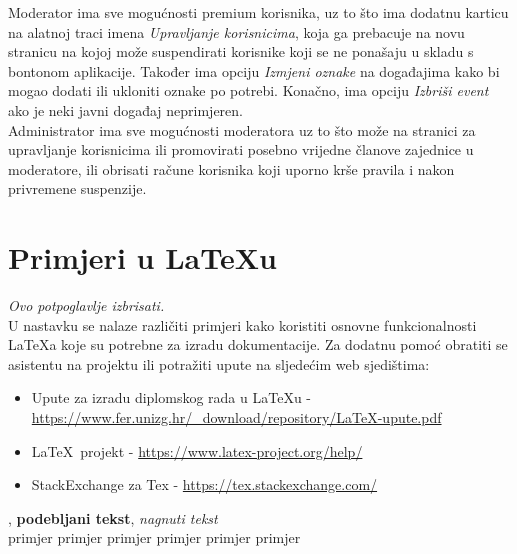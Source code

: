 		\indent Moderator ima sve mogućnosti premium korisnika, uz to što ima dodatnu karticu na alatnoj traci imena \textit{Upravljanje korisnicima}, koja ga prebacuje na novu stranicu na kojoj može suspendirati korisnike koji se ne ponašaju u skladu s bontonom aplikacije. Također ima opciju \textit{Izmjeni oznake} na događajima kako bi mogao dodati ili ukloniti oznake po potrebi. Konačno, ima opciju \textit{Izbriši event} ako je neki javni događaj neprimjeren. \\
		
		\indent Administrator ima sve mogućnosti moderatora uz to što može na stranici za upravljanje korisnicima ili promovirati posebno vrijedne članove zajednice u moderatore, ili obrisati račune korisnika koji uporno krše pravila i nakon privremene suspenzije.
		
		\section{Primjeri u \LaTeX u}
		
		\textit{Ovo potpoglavlje izbrisati.}\\

		U nastavku se nalaze različiti primjeri kako koristiti osnovne funkcionalnosti \LaTeX a koje su potrebne za izradu dokumentacije. Za dodatnu pomoć obratiti se asistentu na projektu ili potražiti upute na sljedećim web sjedištima:
		\begin{itemize}
			\item Upute za izradu diplomskog rada u \LaTeX u - \url{https://www.fer.unizg.hr/_download/repository/LaTeX-upute.pdf}
			\item \LaTeX\ projekt - \url{https://www.latex-project.org/help/}
			\item StackExchange za Tex - \url{https://tex.stackexchange.com/}\\
		
		\end{itemize} 	


		
		\noindent {}, \textbf{podebljani tekst}, 	\textit{nagnuti tekst}\\
		\noindent \normalsize primjer \large primjer \Large primjer \LARGE {primjer} \huge {primjer} \Huge primjer \normalsize
				
